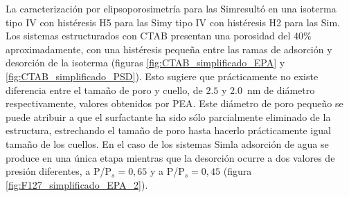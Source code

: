 			La caracterización por elipsoporosimetría para las Sim\pdmF\space resultó en una isoterma tipo IV con histéresis H5 para las Sim\pdmC\space y tipo IV con histéresis H2 para las Sim\pdmF\cite{Thommes2015}. Los sistemas estructurados con CTAB presentan una porosidad del 40\% aproximadamente, con una histéresis pequeña entre las ramas de adsorción y desorción de la isoterma (figuras \ref{fig:CTAB_simplificado_EPA}  y \ref{fig:CTAB_simplificado_PSD}). Esto sugiere que prácticamente no existe diferencia entre el tamaño de poro y cuello, de $2.5$ y \SI{2.0}{\nm} de diámetro respectivamente, valores obtenidos por PEA. Este diámetro de poro pequeño se puede atribuir a que el surfactante ha sido sólo parcialmente eliminado de la estructura, estrechando el tamaño de poro hasta hacerlo prácticamente igual tamaño de los cuellos. En el caso de los sistemas Sim\pdmF\space la adsorción de agua se produce en una única etapa mientras que la desorción ocurre a dos valores de presión diferentes, a P/P$_s=0,65$ y a P/P$_s=0,45$ (figura \ref{fig:F127_simplificado_EPA_2}). 

